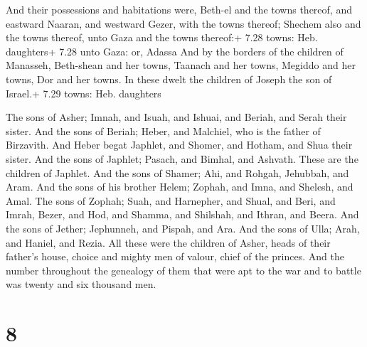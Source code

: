  And their possessions and habitations were, Beth-el and
the towns thereof, and eastward Naaran, and westward Gezer, with the
towns thereof; Shechem also and the towns thereof, unto Gaza and the
towns thereof:+ 7.28 towns: Heb. daughters+ 7.28 unto Gaza: or, Adassa
 And by the borders of the children of Manasseh, Beth-shean
and her towns, Taanach and her towns, Megiddo and her towns, Dor and her
towns. In these dwelt the children of Joseph the son of Israel.+ 7.29
towns: Heb. daughters

 The sons of Asher; Imnah, and Isuah, and Ishuai, and
Beriah, and Serah their sister.  And the sons of Beriah;
Heber, and Malchiel, who is the father of Birzavith.  And
Heber begat Japhlet, and Shomer, and Hotham, and Shua their sister.
 And the sons of Japhlet; Pasach, and Bimhal, and Ashvath.
These are the children of Japhlet.  And the sons of Shamer;
Ahi, and Rohgah, Jehubbah, and Aram.  And the sons of his
brother Helem; Zophah, and Imna, and Shelesh, and Amal. 
The sons of Zophah; Suah, and Harnepher, and Shual, and Beri, and Imrah,
 Bezer, and Hod, and Shamma, and Shilshah, and Ithran, and
Beera.  And the sons of Jether; Jephunneh, and Pispah, and
Ara.  And the sons of Ulla; Arah, and Haniel, and Rezia.
 All these were the children of Asher, heads of their
father's house, choice and mighty men of valour, chief of the princes.
And the number throughout the genealogy of them that were apt to the war
and to battle was twenty and six thousand men.

\hypertarget{section-7}{%
\section{8}\label{section-7}}

